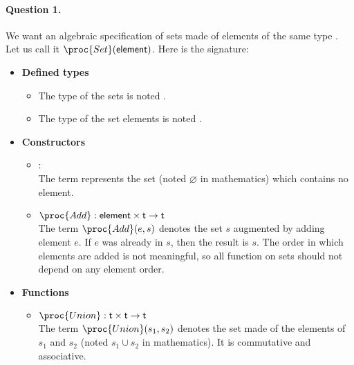 \paragraph{Question 1.} We want an algebraic specification of sets
made of elements of the same type . Let us call it 
\(\proc{Set}(\type{element})\). Here is the signature:
   \begin{itemize}

     \item \textbf{Defined types}

     \begin{itemize}

       \item The type of the sets is noted .

       \item The type of the set elements is noted .
  
     \end{itemize}

     \item \textbf{Constructors}
     \begin{itemize}

       \item {} : \\
       The term  represents the set (noted
       \(\varnothing\) in mathematics) which contains no element.

       \item \(\proc{Add} : \type{element} \times \type{t} \rightarrow
         \type{t}\)\\ The term \(\proc{Add} (e, s)\) denotes
         the set \(s\) augmented by adding element \(e\). If \(e\)
         was already in \(s\), then the result is \(s\). The order
         in which elements are added is not meaningful, so all
         function on sets should not depend on any element order.

     \end{itemize}

     \item \textbf{Functions}
     \begin{itemize}

       \item \(\proc{Union} : \type{t} \times \type{t} \rightarrow
         \type{t}\)\\
       The term \(\proc{Union} (s_1, s_2)\) denotes the set
       made of the elements of \(s_1\) and \(s_2\) (noted \(s_1
       \cup s_2\) in mathematics). It is commutative and
       associative.


\end{itemize}
\end{itemize}
